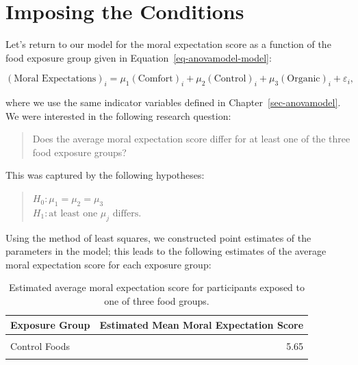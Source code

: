 \documentclass[
  letterpaper,
  DIV=11,
  numbers=noendperiod]{scrreprt}
\theoremstyle{definition}
\theoremstyle{definition}
\theoremstyle{plain}
\theoremstyle{remark}
\begin{document}
\hypertarget{imposing-the-conditions-1}{%
\section{Imposing the Conditions}\label{imposing-the-conditions-1}}

Let's return to our model for the moral expectation score as a function
of the food exposure group given in Equation~\ref{eq-anovamodel-model}:

\[(\text{Moral Expectations})_i = \mu_1 (\text{Comfort})_i + \mu_2 (\text{Control})_i + \mu_3 (\text{Organic})_i + \varepsilon_i,\]

where we use the same indicator variables defined in
Chapter~\ref{sec-anovamodel}. We were interested in the following
research question:

\begin{quote}
Does the average moral expectation score differ for at least one of the
three food exposure groups?
\end{quote}

This was captured by the following hypotheses:

\begin{quote}
\(H_0: \mu_1 = \mu_2 = \mu_3\)\\
\(H_1: \text{at least one } \mu_j \text{ differs}.\)
\end{quote}

Using the method of least squares, we constructed point estimates of the
parameters in the model; this leads to the following estimates of the
average moral expectation score for each exposure group:

\hypertarget{tbl-anovaconditions-fit}{}
\begin{table}
\caption{\label{tbl-anovaconditions-fit}Estimated average moral expectation score for participants exposed to
one of three food groups. }\tabularnewline

\centering
\begin{tabular}[t]{lr}
\toprule
Exposure Group & Estimated Mean Moral Expectation Score\\
\midrule
\cellcolor{gray!6}{Comfort Foods} & \cellcolor{gray!6}{5.58}\\
Control Foods & 5.65\\
\cellcolor{gray!6}{Organic Foods} & \cellcolor{gray!6}{5.75}\\
\bottomrule
\end{tabular}
\end{table}
\end{document}
